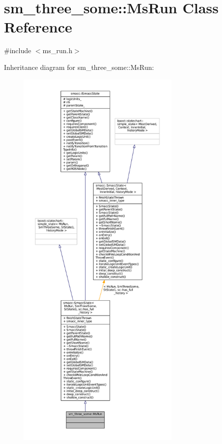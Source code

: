 \hypertarget{classsm__three__some_1_1MsRun}{}\section{sm\+\_\+three\+\_\+some\+:\+:Ms\+Run Class Reference}
\label{classsm__three__some_1_1MsRun}


{\ttfamily \#include $<$ms\+\_\+run.\+h$>$}



Inheritance diagram for sm\+\_\+three\+\_\+some\+:\+:Ms\+Run\+:
\nopagebreak
\begin{figure}[H]
\begin{center}
\leavevmode
\includegraphics[height=550pt]{classsm__three__some_1_1MsRun__inherit__graph}
\end{center}
\end{figure}


